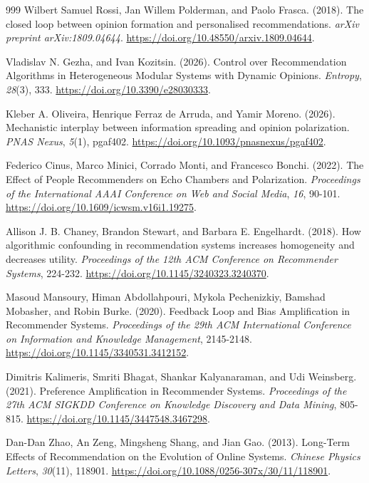 \documentclass[10pt,a4paper]{article}
\begin{document}
\begin{thebibliography}{999}
Wilbert Samuel Rossi, Jan Willem Polderman, and Paolo Frasca. (2018). The closed loop between opinion formation and personalised recommendations. \textit{arXiv preprint arXiv:1809.04644}. \url{https://doi.org/10.48550/arxiv.1809.04644}.

Vladislav N. Gezha, and Ivan Kozitsin. (2026). Control over Recommendation Algorithms in Heterogeneous Modular Systems with Dynamic Opinions. \textit{Entropy}, \textit{28}(3), 333. \url{https://doi.org/10.3390/e28030333}.

Kleber A. Oliveira, Henrique Ferraz de Arruda, and Yamir Moreno. (2026). Mechanistic interplay between information spreading and opinion polarization. \textit{PNAS Nexus}, \textit{5}(1), pgaf402. \url{https://doi.org/10.1093/pnasnexus/pgaf402}.

Federico Cinus, Marco Minici, Corrado Monti, and Francesco Bonchi. (2022). The Effect of People Recommenders on Echo Chambers and Polarization. \textit{Proceedings of the International AAAI Conference on Web and Social Media}, \textit{16}, 90-101. \url{https://doi.org/10.1609/icwsm.v16i1.19275}.

Allison J. B. Chaney, Brandon Stewart, and Barbara E. Engelhardt. (2018). How algorithmic confounding in recommendation systems increases homogeneity and decreases utility. \textit{Proceedings of the 12th ACM Conference on Recommender Systems}, 224-232. \url{https://doi.org/10.1145/3240323.3240370}.

Masoud Mansoury, Himan Abdollahpouri, Mykola Pechenizkiy, Bamshad Mobasher, and Robin Burke. (2020). Feedback Loop and Bias Amplification in Recommender Systems. \textit{Proceedings of the 29th ACM International Conference on Information and Knowledge Management}, 2145-2148. \url{https://doi.org/10.1145/3340531.3412152}.

Dimitris Kalimeris, Smriti Bhagat, Shankar Kalyanaraman, and Udi Weinsberg. (2021). Preference Amplification in Recommender Systems. \textit{Proceedings of the 27th ACM SIGKDD Conference on Knowledge Discovery and Data Mining}, 805-815. \url{https://doi.org/10.1145/3447548.3467298}.

Dan-Dan Zhao, An Zeng, Mingsheng Shang, and Jian Gao. (2013). Long-Term Effects of Recommendation on the Evolution of Online Systems. \textit{Chinese Physics Letters}, \textit{30}(11), 118901. \url{https://doi.org/10.1088/0256-307x/30/11/118901}.


\end{thebibliography}
\end{document}
